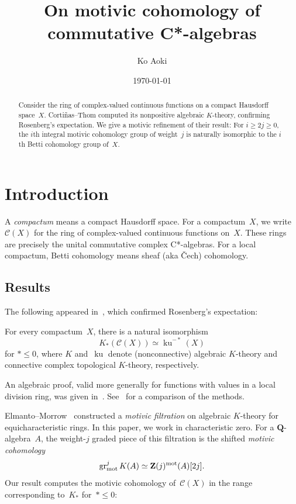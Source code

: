 \documentclass[11pt,a4paper]{amsart}
\title{On motivic cohomology of commutative C*-algebras}
\author{Ko Aoki}
\date{\today}
\numberwithin{equation}{section}
\theoremstyle{plain}
\theoremstyle{definition}
\theoremstyle{remark}
\newcommand{\ZZ}{\mathbf{Z}}
\newcommand{\QQ}{\mathbf{Q}}
\newcommand{\mot}{\textnormal{mot}}
\newcommand{\ku}{\operatorname{ku}}
\newcommand{\gr}{\operatorname{gr}}
\newcommand{\Cls}[1]{\mathscr{#1}}
\begin{document}
\begin{abstract}
  Consider the ring
  of complex-valued continuous functions
  on a compact Hausdorff space~\(X\).
  Cortiñas–Thom computed its nonpositive algebraic \(K\)-theory,
  confirming Rosenberg’s expectation.
  We give a motivic refinement of their result:
  For \(i\geq2j\geq0\),
  the \(i\)th integral motivic cohomology group
  of weight~\(j\)
  is naturally isomorphic
  to the \(i\)th Betti cohomology group of~\(X\).
\end{abstract}

\maketitle


\section{Introduction}\label{s:intro}

A \emph{compactum} means a compact Hausdorff space.
For a compactum~\(X\),
we write
\(
  \Cls{C}(X)
\)
for the ring
of complex-valued continuous functions on~\(X\).
These rings are precisely
the unital commutative complex C*-algebras.
For a local compactum, Betti cohomology means sheaf (aka Čech) cohomology.

\subsection{Results}\label{ss:results}

The following appeared in~\cite[Corollary~6.9]{CortinasThom12},
which confirmed Rosenberg’s expectation:

\begin{theorem}\label{xhar7u}
  For every compactum~\(X\),
  there is a natural isomorphism
  \begin{equation*}
    K_{*}(\Cls{C}(X))\simeq\ku^{-{*}}(X)
  \end{equation*}
  for \({*}\leq0\),
  where \(K\)
  and~\(\ku\)
  denote (nonconnective) algebraic \(K\)-theory
  and connective complex topological \(K\)-theory,
  respectively.
\end{theorem}

An algebraic proof,
valid more generally for functions with values
in a local division ring, was given in~\cite{k-ros-1}.
See~\cite[Section~1.1]{k-ros-1}
for a comparison of the methods.

Elmanto–Morrow~\cite{ElmantoMorrow}
constructed a \emph{motivic filtration} on algebraic \(K\)-theory
for equicharacteristic rings.
In this paper, we work in characteristic zero.
For a \(\QQ\)-algebra~\(A\),
the weight-\(j\) graded piece of this filtration is
the shifted \emph{motivic cohomology}
\begin{equation*}
  \gr^j_{\mot}K(A)
  \simeq \ZZ(j)^{\mot}(A)[2j].
\end{equation*}
Our result computes the motivic cohomology of~\(\Cls{C}(X)\)
in the range corresponding to~\(K_{*}\) for~\({*}\leq0\):
\end{document}
